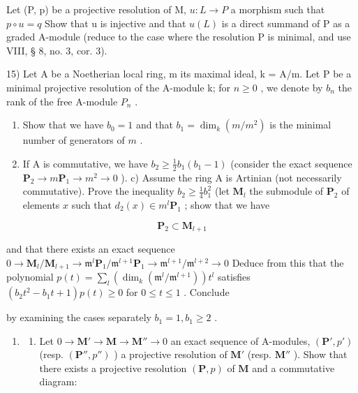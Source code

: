Let (P, p) be a projective resolution of M, \(u : L \to P\) a morphism such that \(p \circ u = q\) Show that u is injective and that \(u(L)\) is a direct summand of P as a graded A-module (reduce to the case where the resolution P is minimal, and use VIII, § 8, no. 3, cor. 3).

15) Let A be a Noetherian local ring, m its maximal ideal, k = A/m. Let P be a minimal projective resolution of the A-module k; for \(n \geqslant 0\) , we denote by \(b_{n}\) the rank of the free A-module \(P_{n}\) .

\begin{enumerate}
\def\labelenumi{\alph{enumi})}
\item
  Show that we have \(b_0 = 1\) and that \(b_1 = \dim_k (m/m^2)\) is the minimal number of generators of \(m\) .
\item
  If A is commutative, we have \(b_{2} \geqslant \frac{1}{2} b_{1}(b_{1} - 1)\) (consider the exact sequence \(\mathbf{P}_{2} \to m\mathbf{P}_{1} \to m^{2} \to 0\) ). c) Assume the ring A is Artinian (not necessarily commutative). Prove the inequality \(b_{2} \geqslant \frac{1}{4} b_{1}^{2}\) (let \(\mathbf{M}_{l}\) the submodule of \(\mathbf{P}_{2}\) of elements \(x\) such that \(d_{2}(x) \in m^{l}\mathbf{P}_{1}\) ; show that we have
\end{enumerate}

\[
\mathbf {P} _ {2} \subset \mathbf {M} _ {l + 1}
\]

and that there exists an exact sequence \(0 \to \mathbf{M}_l / \mathbf{M}_{l+1} \to \mathfrak{m}^l \mathbf{P}_1 / \mathfrak{m}^{l+1} \mathbf{P}_1 \to \mathfrak{m}^{l+1} / \mathfrak{m}^{l+2} \to 0\) Deduce from this that the polynomial \(p(t) = \sum_{l} (\dim_k (\mathfrak{m}^l / \mathfrak{m}^{l+1})) t^l\) satisfies \((b_2 t^2 - b_1 t + 1)p(t) \geqslant 0\) for \(0 \leqslant t \leqslant 1\) . Conclude

by examining the cases separately \(b_{1} = 1, b_{1} \geqslant 2\) .

\begin{enumerate}
\def\labelenumi{\arabic{enumi})}
\setcounter{enumi}{15}
\tightlist
\item
  \begin{enumerate}
  \def\labelenumii{\alph{enumii})}
  \tightlist
  \item
    Let \(0 \to \mathbf{M}' \to \mathbf{M} \to \mathbf{M}'' \to 0\) an exact sequence of A-modules, \((\mathbf{P}', p')\) (resp. \((\mathbf{P}'', p'')\) ) a projective resolution of \(\mathbf{M}'\) (resp. \(\mathbf{M}''\) ). Show that there exists a projective resolution \((\mathbf{P}, p)\) of \(\mathbf{M}\) and a commutative diagram:
  \end{enumerate}
\end{enumerate}

